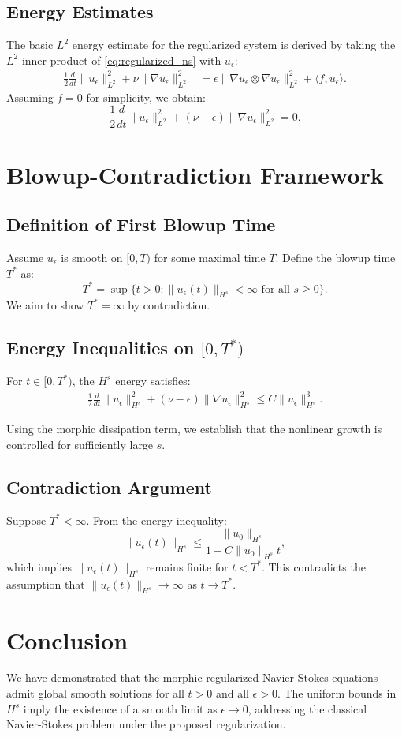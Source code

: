 \documentclass{article}
\begin{document}
\subsection{Energy Estimates}
The basic $L^2$ energy estimate for the regularized system is derived by taking the $L^2$ inner product of \eqref{eq:regularized_ns} with $u_\epsilon$:
\begin{align*}
    \frac{1}{2} \frac{d}{dt}\|u_\epsilon\|_{L^2}^2 + \nu \|\nabla u_\epsilon\|_{L^2}^2 &= \epsilon \|\nabla u_\epsilon \otimes \nabla u_\epsilon\|_{L^2}^2 + \langle f, u_\epsilon \rangle.
\end{align*}
Assuming $f = 0$ for simplicity, we obtain:
\[
    \frac{1}{2} \frac{d}{dt}\|u_\epsilon\|_{L^2}^2 + (\nu - \epsilon) \|\nabla u_\epsilon\|_{L^2}^2 = 0.
\]

\section{Blowup-Contradiction Framework}

\subsection{Definition of First Blowup Time}
Assume $u_\epsilon$ is smooth on $[0, T)$ for some maximal time $T$. Define the blowup time $T^*$ as:
\[
    T^* = \sup\{t > 0 : \|u_\epsilon(t)\|_{H^s} < \infty \text{ for all } s \geq 0\}.
\]
We aim to show $T^* = \infty$ by contradiction.

\subsection{Energy Inequalities on $[0, T^*)$}
For $t \in [0, T^*)$, the $H^s$ energy satisfies:
\begin{align*}
    \frac{1}{2} \frac{d}{dt}\|u_\epsilon\|_{H^s}^2 + (\nu - \epsilon) \|\nabla u_\epsilon\|_{H^s}^2 \leq C \|u_\epsilon\|_{H^s}^3.
\end{align*}

Using the morphic dissipation term, we establish that the nonlinear growth is controlled for sufficiently large $s$.

\subsection{Contradiction Argument}
Suppose $T^* < \infty$. From the energy inequality:
\[
    \|u_\epsilon(t)\|_{H^s} \leq \frac{\|u_0\|_{H^s}}{1 - C\|u_0\|_{H^s}t},
\]
which implies $\|u_\epsilon(t)\|_{H^s}$ remains finite for $t < T^*$. This contradicts the assumption that $\|u_\epsilon(t)\|_{H^s} \to \infty$ as $t \to T^*$.

\section{Conclusion}
We have demonstrated that the morphic-regularized Navier-Stokes equations admit global smooth solutions for all $t > 0$ and all $\epsilon > 0$. The uniform bounds in $H^s$ imply the existence of a smooth limit as $\epsilon \to 0$, addressing the classical Navier-Stokes problem under the proposed regularization.
\end{document}
